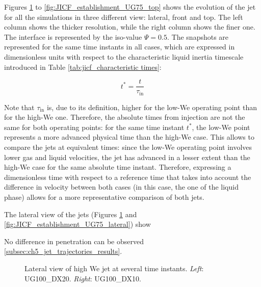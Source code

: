 
Figures \ref{fig:JICF_establishment_UG100_lateral} to \ref{fig:JICF_establishment_UG75_top} shows the evolution of the jet for all the simulations in three different view: lateral, front and top. The left column shows the thicker resolution, while the right column shows the finer one. The interface is represented by the iso-value $\Psi = 0.5$. The snapshots are represented for the same time instants in all cases, which are expressed in dimensionless units with respect to the characteristic liquid inertia timescale introduced in Table \ref{tab:jicf_characteristic times}:

\begin{equation}
\label{eq:t_dimensionless_with_tau_in}
t^* = \frac{t}{\tau_\mathrm{in}}
\end{equation}

Note that $\tau_\mathrm{in}$ is, due to its definition, higher for the low-We operating point than for the high-We one. Therefore, the absolute times from injection are not the same for both operating points: for the same time instant $t^*$, the low-We point represents a more advanced physical time than the high-We case. This allows to compare the jets at equivalent times: since the low-We operating point involves lower gas and liquid velocities, the jet has advanced in a lesser extent than the high-We case for the same absolute time instant. Therefore, expressing a dimensionless time with respect to a reference time that takes into account the difference in velocity between both cases (in this case, the one of the liquid phase) allows for a more representative comparison of both jets.

The lateral view of the jets (Figures \ref{fig:JICF_establishment_UG100_lateral} and \ref{fig:JICF_establishment_UG75_lateral}) show 

No difference in penetration can be observed \ref{subsec:ch5_jet_trajectories_results}.


\clearpage

\begin{figure}[ht]
\centering
{}
\caption[Lateral view of high We jet at several time instants. ]{Lateral view of high We jet at several time instants. \textsl{Left}: UG100\_DX20. \textsl{Right}: UG100\_DX10.}
\label{fig:JICF_establishment_UG100_lateral}
\end{figure}

